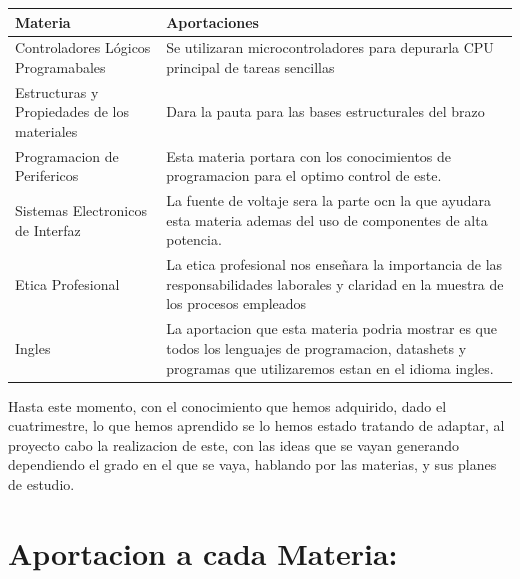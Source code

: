 \documentclass[14pt,a4paper]{article}
\begin{document}
\begin{table}[htbp]
\begin{center}
\begin{tabular}{|l|l|}
\hline
Materia & Aportaciones \\
\hline \hline
Controladores Lógicos Programabales & \parbox{17em}{Se utilizaran microcontroladores para depurarla CPU principal de tareas sencillas } \\ \hline
Estructuras y Propiedades de los materiales & \parbox{17em}{Dara la pauta para las bases estructurales del brazo} \\ \hline
Programacion de Perifericos & \parbox{17em} {Esta materia portara con los conocimientos de programacion para el optimo control de este.} \\ \hline
Sistemas Electronicos de Interfaz & \parbox{17em} {La fuente de voltaje sera la parte ocn la que ayudara esta materia ademas del uso de componentes de alta potencia.} \\ \hline
Etica Profesional & \parbox{17em} {La etica profesional nos enseñara la importancia de las responsabilidades laborales y claridad en la muestra de los procesos empleados} \\ \hline
Ingles & \parbox{17em} {La aportacion que esta materia podria mostrar es que todos los lenguajes de programacion, datashets y programas que utilizaremos estan en el idioma ingles.} \\ \hline

\end{tabular}
\end{center}
\end{table}

Hasta este momento, con el conocimiento que hemos adquirido, dado el cuatrimestre, lo que hemos aprendido se lo hemos estado tratando de adaptar, al proyecto cabo la realizacion de este, con las ideas que se vayan generando dependiendo el grado en el que se vaya, hablando por las materias, y sus planes de estudio.

\section{Aportacion a cada Materia:}
\end{document}
